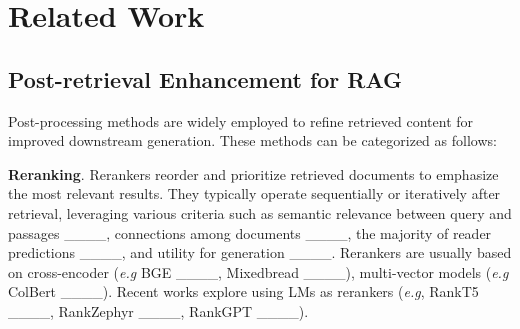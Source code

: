 \section{Related Work}
\subsection{Post-retrieval Enhancement for RAG}
Post-processing methods are widely employed to refine retrieved content for improved downstream generation. These methods can be categorized as follows:

\textbf{Reranking}. Rerankers reorder and prioritize retrieved documents to emphasize the most relevant results. They typically operate sequentially or iteratively after retrieval, leveraging various criteria such as semantic relevance between query and passages ____, connections among documents ____, the majority of reader predictions ____, and utility for generation ____. Rerankers are usually based on cross-encoder (\emph{e.g} BGE ____, Mixedbread ____), multi-vector models (\emph{e.g} ColBert ____). Recent works explore using LMs as rerankers (\emph{e.g}, RankT5 ____, RankZephyr ____, RankGPT ____).  

